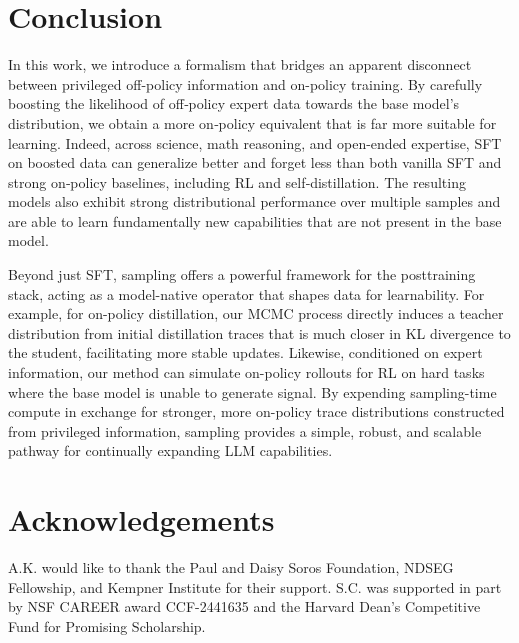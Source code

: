 \documentclass{article}
\begin{document}
\section{Conclusion}

In this work, we introduce a formalism that bridges an apparent disconnect between privileged off-policy information and on-policy training. By carefully boosting the likelihood of off‑policy expert data towards the base model’s distribution, we obtain a more on‑policy equivalent that is far more suitable for learning. Indeed, across science, math reasoning, and open-ended expertise, SFT on boosted data can generalize better and forget less than both vanilla SFT and strong on‑policy baselines, including RL and self‑distillation. The resulting models also exhibit strong distributional performance over multiple samples and are able to learn fundamentally new capabilities that are not present in the base model. 

Beyond just SFT, sampling offers a powerful framework for the posttraining stack, acting as a model-native operator that shapes data for learnability. For example, for on-policy distillation, our MCMC process directly induces a teacher distribution from initial distillation traces that is much closer in KL divergence to the student, facilitating more stable updates. Likewise, conditioned on expert information, our method can simulate on-policy rollouts for RL on hard tasks where the base model is unable to generate signal. By expending sampling-time compute in exchange for stronger, more on-policy trace distributions constructed from privileged information, sampling provides a simple, robust, and scalable pathway for continually expanding LLM capabilities.








\section{Acknowledgements}
A.K. would like to thank the Paul and Daisy Soros Foundation, NDSEG Fellowship, and Kempner
Institute for their support.
S.C. was supported in part by NSF CAREER award CCF-2441635 and the Harvard Dean's Competitive Fund for Promising Scholarship.
\end{document}
